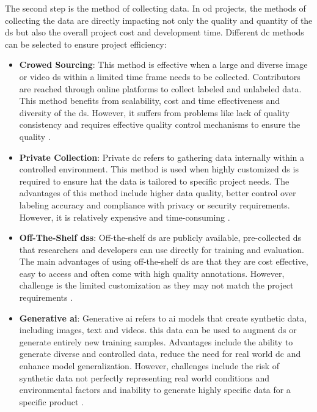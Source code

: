 The second step is the method of collecting data. In \gls{od} projects, the methods of collecting the data are directly impacting not only the quality and quantity of the \gls{ds} but also the overall project cost and development time. Different \gls{dc} methods can be selected to ensure project efficiency:

\begin{itemize}
    \item \textbf{Crowed Sourcing}: This method is effective when a large and diverse image or video \gls{ds} within a limited time frame needs to be collected. Contributors are reached through online platforms to collect labeled and unlabeled data. This method benefits from scalability, cost and time effectiveness and diversity of the \gls{ds}. However, it suffers from problems like lack of quality consistency and requires effective quality control mechanisms to ensure the quality \cite{AIMultiple_Computer_Vision_Training_Data}.
    \item \textbf{Private Collection}: Private \gls{dc} refers to gathering data internally within a controlled environment. This method is used when highly customized \gls{ds} is required to ensure hat the data is tailored to specific project needs. The advantages of this method include higher data quality, better control over labeling accuracy and compliance with privacy or security requirements. However, it is relatively expensive and time-consuming \cite{AIMultiple_Computer_Vision_Training_Data}.
    \item \textbf{Off-The-Shelf \gls{ds}s}: Off-the-shelf \gls{ds} are publicly available, pre-collected \gls{ds} that researchers and developers can use directly for training and evaluation. The main advantages of using off-the-shelf \gls{ds} are that they are cost effective, easy to access and often come with high quality annotations. However, challenge is the limited customization as they may not match the project requirements \cite{AIMultiple_Computer_Vision_Training_Data}.
    \item \textbf{Generative \gls{ai}}: Generative \gls{ai} refers to \gls{ai} models that create synthetic data, including images, text and videos. this data can be used to augment \gls{ds} or generate entirely new training samples. Advantages include the ability to generate diverse and controlled data, reduce the need for real world \gls{dc} and enhance model generalization. However, challenges include the risk of synthetic data not perfectly representing real world conditions and environmental factors and inability to generate highly specific data for a specific product \cite{AIMultiple_Computer_Vision_Training_Data}.
\end{itemize}

